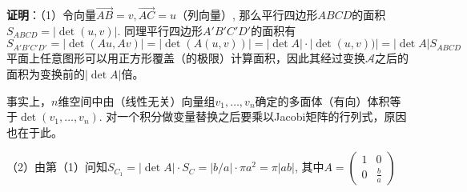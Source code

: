 \newcommand*{\xMin}{0}
\newcommand*{\xMax}{4}
\newcommand*{\yMin}{0}
\newcommand*{\yMinplusone}{1}
\newcommand*{\yMax}{4}
\begin{figure}[H]
\centering
{}
\end{figure}


{\bf 证明}：（1）令向量$\overrightarrow{AB} = v, \overrightarrow{AC} = u$（列向量）, 那么平行四边形$ABCD$的面积$S_{ABCD} = |\det(u ,v)|$. 同理平行四边形$A'B'C'D'$的面积有
$$S_{A'B'C'D'} = |\det(Au, Av)| = |\det(A(u, v))| = |\det A| \cdot |\det (u, v))| = |\det A| S_{ABCD}$$
平面上任意图形可以用正方形覆盖（的极限）计算面积，因此其经过变换$\mathscr{A}$之后的面积为变换前的$|\det A|$倍。

事实上，$n$维空间中由（线性无关）向量组$v_1,\ldots,v_n$确定的多面体（有向）体积等于$\det(v_1,\ldots,v_n)$. 对一个积分做变量替换之后要乘以Jacobi矩阵的行列式，原因也在于此。

（2）由第（1）问知$S_{C_1} = |\det A|\cdot S_{C} = |b/a|\cdot \pi a^2 = \pi |ab|$, 其中$A = \begin{pmatrix} 1 & 0 \\ 0 & \frac{b}{a} \end{pmatrix}$

